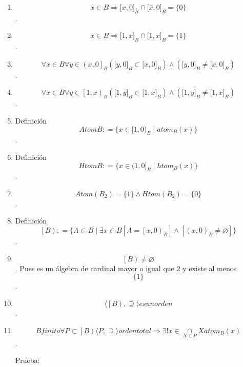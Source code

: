 \begin{enumerate}
\begin{enumerate}
\begin{enumerate}
      \emph{\[{x \in B}\Rightarrow{{{\lbrack{x,0}\rbrack}_{B} \cap {\lbrack{1,x}\rbrack}_{B}} = {\{ x\}}}\]}.
    \item
      \emph{\[{x \in B}\Rightarrow{{{\lbrack{x,0}\rbrack}_{B} \cap {\lbrack{\overline{x},0}\rbrack}_{B}} = {\{ 0\}}}\]}.
    \item
      \emph{\[{x \in B}\Rightarrow{{{\lbrack{1,x}\rbrack}_{B} \cap {\lbrack{1,\overline{x}}\rbrack}_{B}} = {\{ 1\}}}\]}.
    \item
      \emph{\[\forall{x \in B}\forall{y \in \left( {x,0} \right\rbrack_{B}}{{({{\lbrack{y,0}\rbrack}_{B} \subset {\lbrack{x,0}\rbrack}_{B}})} \land {({{\lbrack{y,0}\rbrack}_{B} \neq {\lbrack{x,0}\rbrack}_{B}})}}\]}.
    \item
      \emph{\[\forall{x \in B}\forall{y \in \left\lbrack {1,x} \right)_{B}}{{({{\lbrack{1,y}\rbrack}_{B} \subset {\lbrack{1,x}\rbrack}_{B}})} \land {({{\lbrack{1,y}\rbrack}_{B} \neq {\lbrack{1,x}\rbrack}_{B}})}}\]}.
    \item
      Definición\emph{\[\mathit{Atom}B{: = {\{{{x \in \lbrack 1,0)_{B}} \mid \mathsf{\mathit{atom}}_{B}{(x)}}\}}}\]}.
    \item
      Definición\emph{\[\mathit{Htom}B{: = {\{{{x \in (1,0\rbrack_{B}} \mid \mathsf{\mathit{htom}}_{B}{(x)}}\}}}\]}.
    \item
      \emph{\[\mathit{Atom}{{(B_{2})} = {{\{ 1\}} \land \mathit{Htom}}}{{(B_{2})} = {\{ 0\}}}\]}.
    \item
      Definición
      \emph{\[\left\lbrack B \right){: = {\{{{A \subset B} \mid \exists{x \in B}{\left\lbrack {A = \left\lbrack {x,0} \right)_{B}} \right\rbrack \land \left\lbrack {\left( {x,0} \right)_{B} \neq \varnothing} \right\rbrack}}\}}}\]}.
    \item
      \emph{\[\left\lbrack B \right) \neq \varnothing\]}. Pues es un
      álgebra de cardinal mayor o igual que 2 y existe al menos
      \[\{ 1\}\].
    \item
      \emph{\[{\langle{\left\lbrack B \right), \supseteq}\rangle}\mathit{es}\mathit{un}\mathit{orden}\]}.
    \item
      \emph{\[B\mathit{finito}\forall{P \subset \left\lbrack B \right)}{\langle{P, \supseteq}\rangle}\mathit{orden}\mathit{total}\Rightarrow\exists!{x \in \underset{X \in P}{\cap}}X\mathsf{\mathit{atom}}_{B}{(x)}\]}.

      Prueba:


\end{enumerate}
\end{enumerate}
\end{enumerate}

